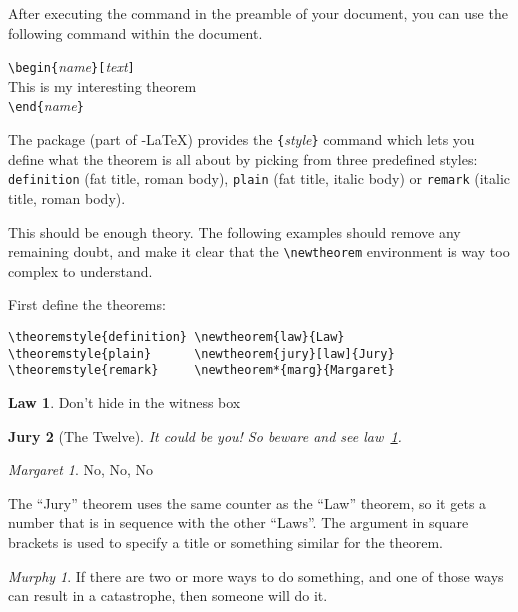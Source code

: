 After executing the  command in the preamble of your
document, you can use the following command within the document.
\begin{code}
\verb|\begin{|\emph{name}\verb|}[|\emph{text}\verb|]|\\
This is my interesting theorem\\
\verb|\end{|\emph{name}\verb|}|     
\end{code}

The  package (part of \AmS-\LaTeX) provides the 
\verb|{|\emph{style}\verb|}|
command which lets you define what the theorem is all about by picking
from three predefined styles: \texttt{definition} (fat title, roman body),
\texttt{plain} (fat title, italic body) or \texttt{remark} (italic
title, roman body).

This should be enough theory. The following examples should
remove any remaining doubt, and make it clear that the
\verb|\newtheorem| environment is way too complex to understand.

\theoremstyle{definition} \newtheorem{law}{Law}
\theoremstyle{plain}      \newtheorem{jury}[law]{Jury}
\theoremstyle{remark}     \newtheorem*{marg}{Margaret}

First define the theorems:

\begin{verbatim}
\theoremstyle{definition} \newtheorem{law}{Law}
\theoremstyle{plain}      \newtheorem{jury}[law]{Jury}
\theoremstyle{remark}     \newtheorem*{marg}{Margaret}
\end{verbatim}

\begin{example}
\begin{law} \label{law:box}
Don't hide in the witness box
\end{law}
\begin{jury}[The Twelve]
It could be you! So beware and
see law~\ref{law:box}.\end{jury}
\begin{marg}No, No, No\end{marg}
\end{example}

The ``Jury'' theorem uses the same counter as the ``Law''
theorem, so it gets a number that is in sequence with
the other ``Laws''. The argument in square brackets is used to specify 
a title or something similar for the theorem.
\begin{example}
\newtheorem{mur}{Murphy}[section]

\begin{mur} If there are two or 
more ways to do something, and 
one of those ways can result in
a catastrophe, then someone 
will do it.\end{mur}
\end{example}

